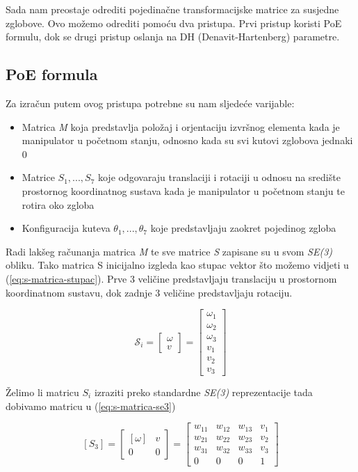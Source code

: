 \documentclass[times, utf8, diplomskirad]{fer}
\begin{document}
Sada nam preostaje odrediti pojedinačne transformacijske matrice za susjedne zglobove.
Ovo možemo odrediti pomoću dva pristupa.
Prvi pristup koristi PoE formulu, dok se drugi pristup oslanja na DH (Denavit-Hartenberg) parametre.
\subsection{PoE formula}
Za izračun putem ovog pristupa potrebne su nam sljedeće varijable:
\begin{itemize}
    \item Matrica \textit{M} koja predstavlja položaj i orjentaciju izvršnog elementa kada je manipulator u početnom stanju, odnosno kada su svi kutovi zglobova jednaki 0
    \item Matrice \textit{$S_1, ..., S_7$} koje odgovaraju translaciji i rotaciji u odnosu na središte prostornog koordinatnog sustava kada je manipulator u početnom stanju te rotira oko zgloba
    \item Konfiguracija kuteva \textit{$\theta_1, ..., \theta_7$} koje predstavljaju zaokret pojedinog zgloba
\end{itemize}
\newpage
Radi lakšeg računanja matrica \textit{M} te sve matrice \textit{S} zapisane su u svom \textit{SE(3)} obliku.
Tako matrica S inicijalno izgleda kao stupac vektor što možemo vidjeti u (\ref{eq:s-matrica-stupac}).
Prve 3 veličine predstavljaju translaciju u prostornom koordinatnom sustavu, dok zadnje 3 veličine predstavljaju rotaciju.

\begin{equation}
    \mathcal{S}_i=\left[\begin{array}{c}
    \omega \\
    v
    \end{array}\right]=\left[\begin{array}{c}
    \omega_1 \\
    \omega_2 \\
    \omega_3 \\
    v_1 \\
    v_2 \\
    v_3
    \end{array}\right]
    \label{eq:s-matrica-stupac}
\end{equation}

Želimo li matricu \textit{$S_i$} izraziti preko standardne \textit{SE(3)} reprezentacije tada dobivamo matricu u (\ref{eq:s-matrica-se3})

\begin{equation}
    \left[S_3\right]=\left[\begin{array}{cc}
    [\omega] & v \\
    0 & 0
\end{array}\right]=
    \left[\begin{array}{cccc}
        w_{11} & w_{12} & w_{13} & v_1 \\
        w_{21} & w_{22} & w_{23} & v_2 \\
        w_{31} & w_{32} & w_{33} & v_3 \\
        0 & 0 & 0 & 1
    \end{array}\right]
    \label{eq:s-matrica-se3}
\end{equation}
\end{document}
